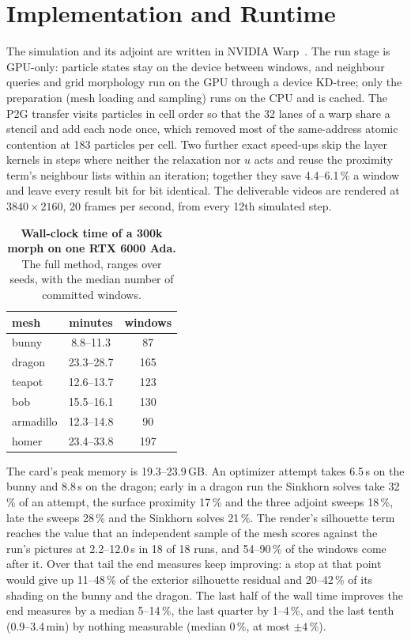 \section{Implementation and Runtime}
\label{ch4:sec_implementation}
The simulation and its adjoint are written in NVIDIA Warp~\citep{macklin2022warp}. The run stage is GPU-only: particle states stay on the device
between windows, and neighbour queries and grid morphology run on the GPU through a device KD-tree; only the preparation
(mesh loading and sampling) runs on the CPU and is cached. The P2G transfer visits particles in cell order so that the 32
lanes of a warp share a stencil and add each node once, which removed most of the same-address atomic contention at 183
particles per cell. Two further exact speed-ups skip the layer kernels in steps where neither the relaxation nor $u$ acts
and reuse the proximity term's neighbour lists within an iteration; together they save 4.4--6.1\,\% a window and leave every
result bit for bit identical. The deliverable videos are rendered at $3840\times2160$, 20 frames per second, from every 12th
simulated step.

\begin{table}[t]
\centering
\footnotesize
\caption[{Wall-clock time of a 300k morph on one RTX 6000 Ada}]{\textbf{Wall-clock time of a 300k morph on one RTX 6000 Ada.} The full method, ranges over seeds, with the median
number of committed windows.}
\label{ch4:tab_runtime}
\begin{tabular}{lcc}
\toprule
mesh & minutes & windows \\
\midrule
bunny & 8.8--11.3 & 87 \\
dragon & 23.3--28.7 & 165 \\
teapot & 12.6--13.7 & 123 \\
bob & 15.5--16.1 & 130 \\
armadillo & 12.3--14.8 & 90 \\
homer & 23.4--33.8 & 197 \\
\bottomrule
\end{tabular}
\end{table}

The card's peak memory is 19.3--23.9\,GB. An optimizer attempt takes 6.5\,s on the bunny and 8.8\,s on the dragon; early in a
dragon run the Sinkhorn solves take 32\,\% of an attempt, the surface proximity 17\,\% and the three adjoint sweeps 18\,\%,
late the sweeps 28\,\% and the Sinkhorn solves 21\,\%. The render's silhouette term reaches the value that an independent
sample of the mesh scores against the run's pictures at 2.2--12.0\,s in 18 of 18 runs, and 54--90\,\% of the windows come
after it. Over that tail the end measures keep improving: a stop at that point would give up 11--48\,\% of the exterior
silhouette residual and 20--42\,\% of its shading on the bunny and the dragon. The last half of the wall time improves the end
measures by a median 5--14\,\%, the last quarter by 1--4\,\%, and the last tenth (0.9--3.4\,min) by nothing measurable (median
0\,\%, at most $\pm4$\,\%).

